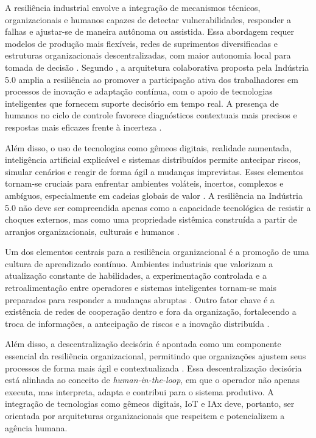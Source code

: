A resiliência industrial envolve a integração de mecanismos técnicos, organizacionais e humanos capazes de detectar vulnerabilidades, responder a falhas e ajustar-se de maneira autônoma ou assistida.
Essa abordagem requer modelos de produção mais flexíveis, redes de suprimentos diversificadas e estruturas organizacionais descentralizadas, com maior autonomia local para tomada de decisão \cite{Santos2025, silva2024}.
Segundo , a arquitetura colaborativa proposta pela Indústria 5.0 amplia a resiliência ao promover a participação ativa dos trabalhadores em processos de inovação e adaptação contínua, com o apoio de tecnologias inteligentes que fornecem suporte decisório em tempo real.
A presença de humanos no ciclo de controle favorece diagnósticos contextuais mais precisos e respostas mais eficazes frente à incerteza \cite{TOTH2023}.

Além disso, o uso de tecnologias como gêmeos digitais, realidade aumentada, inteligência artificial explicável e sistemas distribuídos permite antecipar riscos, simular cenários e reagir de forma ágil a mudanças imprevistas.
Esses elementos tornam-se cruciais para enfrentar ambientes voláteis, incertos, complexos e ambíguos, especialmente em cadeias globais de valor \cite{VALETTE2023}.
A resiliência na Indústria 5.0 não deve ser compreendida apenas como a capacidade tecnológica de resistir a choques externos, mas como uma propriedade sistêmica construída a partir de arranjos organizacionais, culturais e humanos \cite{TOTH2023, Santos2025}.

Um dos elementos centrais para a resiliência organizacional é a promoção de uma cultura de aprendizado contínuo.
Ambientes industriais que valorizam a atualização constante de habilidades, a experimentação controlada e a retroalimentação entre operadores e sistemas inteligentes tornam-se mais preparados para responder a mudanças abruptas \cite{TOTH2023}.
Outro fator chave é a existência de redes de cooperação dentro e fora da organização, fortalecendo a troca de informações, a antecipação de riscos e a inovação distribuída \cite{VALETTE2023, Santana_2023}.

Além disso, a descentralização decisória é apontada como um componente essencial da resiliência organizacional, permitindo que organizações ajustem seus processos de forma mais ágil e contextualizada \cite{PIZON2023, Nahavandi2019}.
Essa descentralização decisória está alinhada ao conceito de \textit{human-in-the-loop}, em que o operador não apenas executa, mas interpreta, adapta e contribui para o sistema produtivo. A integração de tecnologias como gêmeos digitais, \gls{IoT} e \gls{IAx} deve, portanto, ser orientada por arquiteturas organizacionais que respeitem e potencializem a agência humana.


